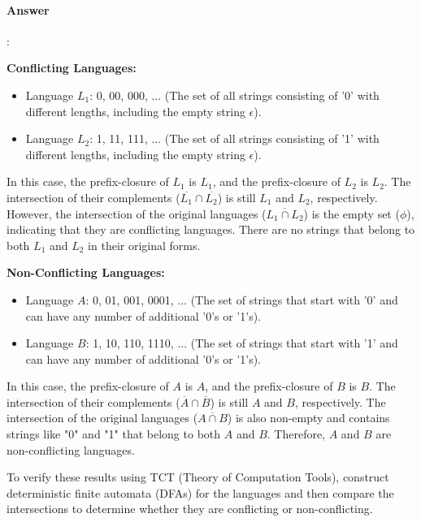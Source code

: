 \documentclass{article}
\begin{document}
\paragraph{Answer}:

\textbf{Conflicting Languages:}

\begin{itemize}
  \item Language $L_1$: {0, 00, 000, ...} (The set of all strings consisting of '0' with different lengths, including the empty string $\epsilon$).
  \item Language $L_2$: {1, 11, 111, ...} (The set of all strings consisting of '1' with different lengths, including the empty string $\epsilon$).
\end{itemize}

In this case, the prefix-closure of $L_1$ is $L_1$, and the prefix-closure of $L_2$ is $L_2$. The intersection of their complements ($\overline{L_1} \cap \overline{L_2}$) is still $L_1$ and $L_2$, respectively. However, the intersection of the original languages ($\overline{L_1 \cap L_2}$) is the empty set ($\phi $), indicating that they are conflicting languages. There are no strings that belong to both $L_1$ and $L_2$ in their original forms.

\textbf{Non-Conflicting Languages:}

\begin{itemize}
  \item Language $A$: {0, 01, 001, 0001, ...} (The set of strings that start with '0' and can have any number of additional '0's or '1's).
  \item Language $B$: {1, 10, 110, 1110, ...} (The set of strings that start with '1' and can have any number of additional '0's or '1's).
\end{itemize}

In this case, the prefix-closure of $A$ is $A$, and the prefix-closure of $B$ is $B$. The intersection of their complements ($\overline{A} \cap \overline{B}$) is still $A$ and $B$, respectively. The intersection of the original languages ($\overline{A \cap B}$) is also non-empty and contains strings like "0" and "1" that belong to both $A$ and $B$. Therefore, $A$ and $B$ are non-conflicting languages.

To verify these results using TCT (Theory of Computation Tools), construct deterministic finite automata (DFAs) for the languages and then compare the intersections to determine whether they are conflicting or non-conflicting.
\end{document}
